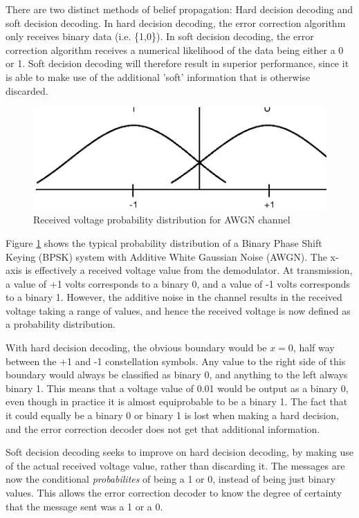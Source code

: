 \documentclass[11pt]{article}
\numberwithin{equation}{subsection}
\begin{document}
There are two distinct methods of belief propagation: Hard decision decoding and soft decision decoding. In hard decision decoding, the error correction algorithm only receives binary data (i.e. \{1,0\}). In soft decision decoding, the error correction algorithm receives a numerical likelihood of the data being either a 0 or 1. Soft decision decoding will therefore result in superior performance, since it is able to make use of the additional 'soft' information that is otherwise discarded.

\begin{figure}[h]
\centering
\includegraphics{BPSK_channel_graph}
\caption{Received voltage probability distribution for AWGN channel}
\label{figure:awgn probability graph}
\end{figure}

Figure \ref{figure:awgn probability graph} shows the typical probability distribution of a Binary Phase Shift Keying (BPSK) system with Additive White Gaussian Noise (AWGN). The x-axis is effectively a received voltage value from the demodulator. At transmission, a value of +1 volts corresponds to a binary 0, and a value of -1 volts corresponds to a binary 1. However, the additive noise in the channel results in the received voltage taking a range of values, and hence the received voltage is now defined as a probability distribution.

With hard decision decoding, the obvious boundary would be $x = 0$, half way between the +1 and -1 constellation symbols. Any value to the right side of this boundary would always be classified as binary 0, and anything to the left always binary 1. This means that a voltage value of 0.01 would be output as a binary 0, even though in practice it is almost equiprobable to be a binary 1. The fact that it could equally be a binary 0 or binary 1 is lost when making a hard decision, and the error correction decoder does not get that additional information.

Soft decision decoding seeks to improve on hard decision decoding, by making use of the actual received voltage value, rather than discarding it. The messages are now the conditional \textit{probabilites} of being a 1 or 0, instead of being just binary values. This allows the error correction decoder to know the degree of certainty that the message sent was a 1 or a 0.
\end{document}
